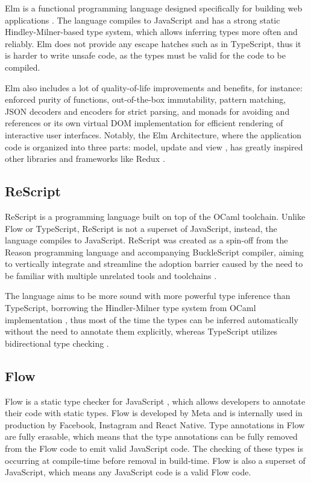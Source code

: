 Elm is a functional programming language designed specifically for building web applications \cite{ElmDelightfulLanguage}. The language compiles to JavaScript and has a strong static Hindley-Milner-based type system, which allows inferring types more often and reliably. Elm does not provide any escape hatches such as  in TypeScript, thus it is harder to write unsafe code, as the types must be valid for the code to be compiled.

Elm also includes a lot of quality-of-life improvements and benefits, for instance: enforced purity of functions, out-of-the-box immutability,  pattern matching, JSON decoders and encoders for strict parsing,  and  monads for avoiding  and  references or its own virtual DOM implementation for efficient rendering of interactive user interfaces. Notably, the Elm Architecture, where the application code is organized into three parts: model, update and view \cite{ElmArchitectureIntroduction}, has greatly inspired other libraries and frameworks like Redux \cite{PriorArtRedux2022}.

\subsection{ReScript}

ReScript is a programming language built on top of the OCaml toolchain. Unlike Flow or TypeScript, ReScript is not a superset of JavaScript, instead, the language compiles to JavaScript. ReScript was created as a spin-off from the Reason programming language and accompanying BuckleScript compiler, aiming to vertically integrate and streamline the adoption barrier caused by the need to be familiar with multiple unrelated tools and toolchains \cite{BuckleScriptReasonRebranding}.

The language aims to be more sound with more powerful type inference than TypeScript, borrowing the Hindler-Milner type system from OCaml implementation \cite{EfficientInsightfulGeneralization, HistoryReScript2022}, thus most of the time the types can be inferred automatically without the need to annotate them explicitly, whereas TypeScript utilizes bidirectional type checking \cite{ReconstructingTypeScriptPart}.

\subsection{Flow}

Flow is a static type checker for JavaScript \cite{chaudhuriFastPreciseType2017, Flow2023}, which allows developers to annotate their code with static types. Flow is developed by Meta and is internally used in production by Facebook, Instagram and React Native. Type annotations in Flow are fully erasable, which means that the type annotations can be fully removed from the Flow code to emit valid JavaScript code. The checking of these types is occurring at compile-time before removal in build-time. Flow is also a superset of JavaScript, which means any JavaScript code is a valid Flow code.

